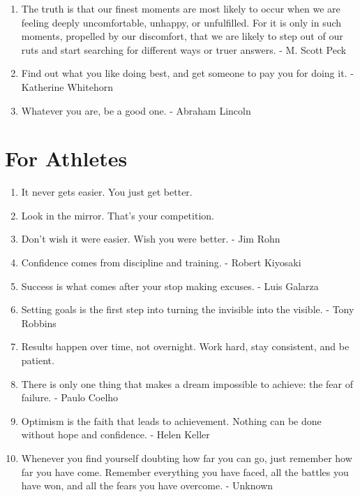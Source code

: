 \begin{enumerate}
            \item The truth is that our finest moments are most likely to occur when we are feeling deeply uncomfortable, unhappy, or unfulfilled. For it is only in such moments, propelled by our discomfort, that we are likely to step out of our ruts and start searching for different ways or truer answers. - M. Scott Peck

            \item Find out what you like doing best, and get someone to pay you for doing it. - Katherine Whitehorn

            \item Whatever you are, be a good one. - Abraham Lincoln

        \end{enumerate}

    \section*{For Athletes}
        \begin{enumerate}
            \item It never gets easier. You just get better.

            \item Look in the mirror. That’s your competition.

            \item Don’t wish it were easier. Wish you were better. - Jim Rohn

            \item Confidence comes from discipline and training. - Robert Kiyosaki

            \item Success is what comes after your stop making excuses. - Luis Galarza

            \item Setting goals is the first step into turning the invisible into the visible. - Tony Robbins

            \item Results happen over time, not overnight. Work hard, stay consistent, and be patient.

            \item There is only one thing that makes a dream impossible to achieve: the fear of failure. - Paulo Coelho

            \item Optimism is the faith that leads to achievement. Nothing can be done without hope and confidence. - Helen Keller

            \item Whenever you find yourself doubting how far you can go, just remember how far you have come. Remember everything you have faced, all the battles you have won, and all the fears you have overcome. - Unknown
        \end{enumerate}

